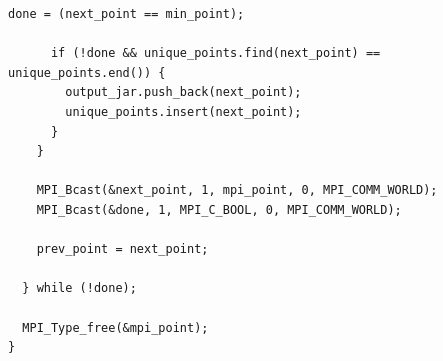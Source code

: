 \documentclass[12pt,a4paper]{article}
\begin{document}
\begin{lstlisting}[caption={Гибридная версия алгоритма(MPI+STL)}]
      done = (next_point == min_point);

      if (!done && unique_points.find(next_point) == unique_points.end()) {
        output_jar.push_back(next_point);
        unique_points.insert(next_point);
      }
    }

    MPI_Bcast(&next_point, 1, mpi_point, 0, MPI_COMM_WORLD);
    MPI_Bcast(&done, 1, MPI_C_BOOL, 0, MPI_COMM_WORLD);

    prev_point = next_point;

  } while (!done);

  MPI_Type_free(&mpi_point);
}
\end{lstlisting}
\end{document}
